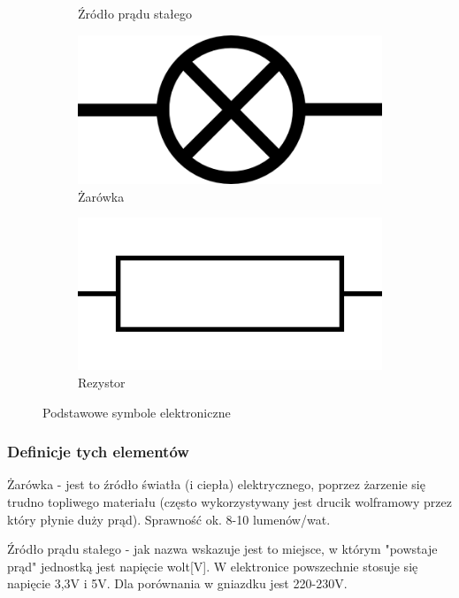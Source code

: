 \documentclass[a4paper,12pt, twoside]{article}
\begin{document}
\begin{figure}
\begin{subfigure}[h]{0.25\textwidth}
      \caption{Źródło prądu stałego}
			\label{fig:DC}
   \end{subfigure}
	\begin{subfigure}[h]{0.25\textwidth}
      \centering
      \includegraphics[scale=0.2]{LightBulb.png}
      \caption{Żarówka}
			\label{fig:zar}
   \end{subfigure}
	\begin{subfigure}[h]{0.25\textwidth}
      \centering
      \includegraphics[scale=0.05]{Resistor-Europe.png}
      \caption{Rezystor}
			\label{fig:rezystor}
   \end{subfigure}
	\caption{Podstawowe symbole elektroniczne}
	\label{fig:symbole}
\end{figure}
\FloatBarrier
   \subsubsection{Definicje tych elementów}
	
Żarówka - jest to źródło światła (i ciepła) elektrycznego, poprzez żarzenie się trudno topliwego materiału (często wykorzystywany jest drucik wolframowy przez który płynie duży prąd). Sprawność ok.
8-10 lumenów/wat. 

Źródło prądu stałego - jak nazwa wskazuje jest to miejsce, w którym "powstaje prąd" jednostką jest napięcie wolt[V]. W elektronice powszechnie stosuje się napięcie 3,3V i 5V. Dla porównania w gniazdku jest 220-230V.
\end{document}
